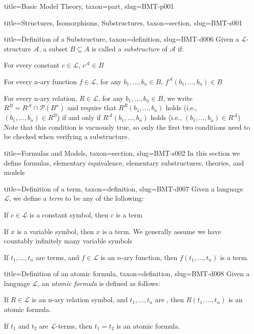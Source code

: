 \documentclass[a4paper]{article}
\begin{document}
\begin{tree}{title={Basic Model Theory}, taxon={part}, slug={BMT-p001}}
\begin{tree}{title={Structures, Isomorphisms, Substructures}, taxon={section}, slug={BMT-s001}}
\begin{tree}{title={Definition of a Substructure}, taxon={definition}, slug={BMT-d006}}
Given a \(\mathcal {L}\)-structure \(\mathcal {A}\), a subset \(B  \subseteq  A\) is called a \emph{substructure} of \(\mathcal {A}\) if:\par{For every constant \(c \in   \mathcal {L}\), \(c^{ \mathcal {A}}  \in  B\)}\par{For every n-ary function \(f \in   \mathcal {L}\), for any \(b_1, \dots , b_n  \in  B\), \(f^{ \mathcal {A}}(b_1, \dots ,b_n)  \in  B\)}\par{For every n-ary relation, \(R \in   \mathcal {L}\), for any \(b_1, \dots , b_n  \in  B\), we write \(R^B = R^{ \mathcal {A}} \cap   \mathcal {P}(B^n)\) and require that
\(R^{B}(b_1, \dots , b_n)\) holds (i.e., \((b_1, \dots , b_n)  \in  R^{B}\))  if and only if \(R^{ \mathcal {A}}(b_1, \dots , b_n)\) holds (i.e., \((b_1, \dots , b_n)  \in  R^{ \mathcal {A}}\)) 
Note that this condition is vacuously true, so only the first two conditions need to be checked when verifying a substructure.}
\end{tree}

\end{tree}


  
  
\begin{tree}{title={Formulas and Models}, taxon={section}, slug={BMT-s002}}
In this section we define formulas, elementary equivalence, elementary substructures, theories, and models
\begin{tree}{title={Definition of a term}, taxon={definition}, slug={BMT-d007}}
Given a language \(\mathcal {L}\), we define a \emph{term} to be any of the following:\par{If \(c \in   \mathcal {L}\) is a constant symbol, then \(c\) is a term}\par{If \(x\) is a variable symbol, then \(x\) is a term. We generally assume we have countably infinitely many variable symbols}\par{If \(t_1,..., t_n\) are terms, and \(f \in   \mathcal {L}\) is an \(n\)-ary function, then \(f(t_1,..., t_n)\) is a term.}
\end{tree}

\begin{tree}{title={Definition of an atomic formula}, taxon={definition}, slug={BMT-d008}}
Given a language \(\mathcal {L}\), an \emph{atomic formula} is defined as follows:\par{If \(R \in   \mathcal {L}\) is an n-ary relation symbol, and \(t_1, \dots , t_n\) are , then \(R(t_1, \dots , t_n)\) is an atomic formula.}\par{If \(t_1\) and \(t_2\) are \(\mathcal {L}\)-terms, then \(t_1 = t_2\) is an atomic formula. }
\end{tree}


\end{tree}
\end{tree}
\end{document}
